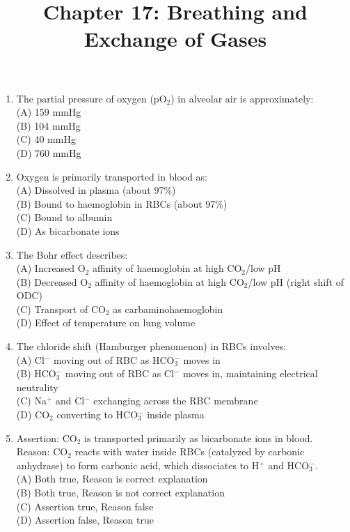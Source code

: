 \documentclass{article}
\begin{document}
\title{Chapter 17: Breathing and Exchange of Gases}
\date{}
\maketitle

\begin{enumerate}[label=Q\arabic*.]

\item The partial pressure of oxygen (pO$_2$) in alveolar air is approximately:
\\(A) 159 mmHg
\\(B) 104 mmHg
\\(C) 40 mmHg
\\(D) 760 mmHg

\item Oxygen is primarily transported in blood as:
\\(A) Dissolved in plasma (about 97\%)
\\(B) Bound to haemoglobin in RBCs (about 97\%)
\\(C) Bound to albumin
\\(D) As bicarbonate ions

\item The Bohr effect describes:
\\(A) Increased O$_2$ affinity of haemoglobin at high CO$_2$/low pH
\\(B) Decreased O$_2$ affinity of haemoglobin at high CO$_2$/low pH (right shift of ODC)
\\(C) Transport of CO$_2$ as carbaminohaemoglobin
\\(D) Effect of temperature on lung volume

\item The chloride shift (Hamburger phenomenon) in RBCs involves:
\\(A) Cl$^-$ moving out of RBC as HCO$_3^-$ moves in
\\(B) HCO$_3^-$ moving out of RBC as Cl$^-$ moves in, maintaining electrical neutrality
\\(C) Na$^+$ and Cl$^-$ exchanging across the RBC membrane
\\(D) CO$_2$ converting to HCO$_3^-$ inside plasma

\item Assertion: CO$_2$ is transported primarily as bicarbonate ions in blood.\\
Reason: CO$_2$ reacts with water inside RBCs (catalyzed by carbonic anhydrase) to form carbonic acid, which dissociates to H$^+$ and HCO$_3^-$.
\\(A) Both true, Reason is correct explanation
\\(B) Both true, Reason is not correct explanation
\\(C) Assertion true, Reason false
\\(D) Assertion false, Reason true


\end{enumerate}
\end{document}
